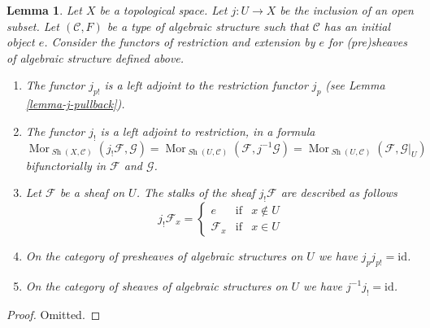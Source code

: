 \documentclass{stacks-project}
\theoremstyle{plain}
\newtheorem{lemma}[subsection]{Lemma}
\theoremstyle{definition}
\theoremstyle{remark}
\numberwithin{equation}{subsection}
\def\Mor{\mathop{\mathrm{Mor}}\nolimits}
\def\Sh{\mathop{\mathit{Sh}}\nolimits}
\begin{document}
\begin{lemma}
\label{lemma-j-shriek-structures}
Let $X$ be a topological space.
Let $j : U \to X$ be the inclusion of an open subset.
Let $(\mathcal{C}, F)$ be a type of algebraic structure
such that $\mathcal{C}$ has an initial object $e$.
Consider the functors of restriction and extension
by $e$ for (pre)sheaves of algebraic structure defined above.
\begin{enumerate}
\item The functor $j_{p!}$ is a left adjoint to the
restriction functor $j_p$ (see Lemma \ref{lemma-j-pullback}).
\item The functor $j_!$ is a left adjoint to restriction,
in a formula
$$
\Mor_{\Sh(X, \mathcal{C})}(j_!\mathcal{F}, \mathcal{G})
=
\Mor_{\Sh(U, \mathcal{C})}(\mathcal{F}, j^{-1}\mathcal{G})
=
\Mor_{\Sh(U, \mathcal{C})}(\mathcal{F}, \mathcal{G}|_U)
$$
bifunctorially in $\mathcal{F}$ and $\mathcal{G}$.
\item Let $\mathcal{F}$ be a sheaf on $U$.
The stalks of the sheaf $j_!\mathcal{F}$ are described
as follows
$$
j_{!}\mathcal{F}_x =
\left\{
\begin{matrix}
e & \text{if} & x \not \in U \\
\mathcal{F}_x & \text{if} & x \in U
\end{matrix}
\right.
$$
\item On the category of presheaves of algebraic structures on $U$
we have $j_pj_{p!} = \text{id}$.
\item On the category of sheaves of algebraic structures on $U$
we have $j^{-1}j_! = \text{id}$.
\end{enumerate}
\end{lemma}

\begin{proof}
Omitted.
\end{proof}
\end{document}
